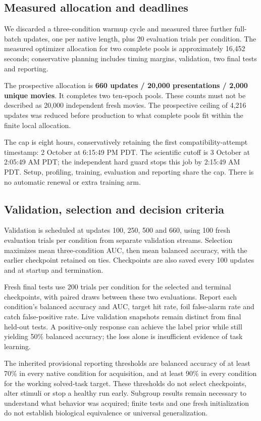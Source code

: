 \documentclass[11pt]{article}
\begin{document}
\subsection{Measured allocation and deadlines}

We discarded a three-condition warmup cycle and measured three further full-batch updates, one per native length, plus 20 evaluation trials per condition. The measured optimizer allocation for two complete pools is approximately 16,452 seconds; conservative planning includes timing margins, validation, two final tests and reporting.

The prospective allocation is \textbf{660 updates / 20,000 presentations / 2,000 unique movies}. It completes two ten-epoch pools. These counts must not be described as 20,000 independent fresh movies. The prospective ceiling of 4,216 updates was reduced before production to what complete pools fit within the finite local allocation.

The cap is eight hours, conservatively retaining the first compatibility-attempt timestamp: 2 October at 6:15:49 PM PDT. The scientific cutoff is 3 October at 2:05:49 AM PDT; the independent hard guard stops this job by 2:15:49 AM PDT. Setup, profiling, training, evaluation and reporting share the cap. There is no automatic renewal or extra training arm.

\subsection{Validation, selection and decision criteria}

Validation is scheduled at updates 100, 250, 500 and 660, using 100 fresh evaluation trials per condition from separate validation streams. Selection maximizes mean three-condition AUC, then mean balanced accuracy, with the earlier checkpoint retained on ties. Checkpoints are also saved every 100 updates and at startup and termination.

Fresh final tests use 200 trials per condition for the selected and terminal checkpoints, with paired draws between these two evaluations. Report each condition's balanced accuracy and AUC, target hit rate, foil false-alarm rate and catch false-positive rate. Live validation snapshots remain distinct from final held-out tests. A positive-only response can achieve the label prior while still yielding 50\% balanced accuracy; the loss alone is insufficient evidence of task learning.

The inherited provisional reporting thresholds are balanced accuracy of at least 70\% in every native condition for acquisition, and at least 90\% in every condition for the working solved-task target. These thresholds do not select checkpoints, alter stimuli or stop a healthy run early. Subgroup results remain necessary to understand what behavior was acquired; finite tests and one fresh initialization do not establish biological equivalence or universal generalization.
\end{document}
